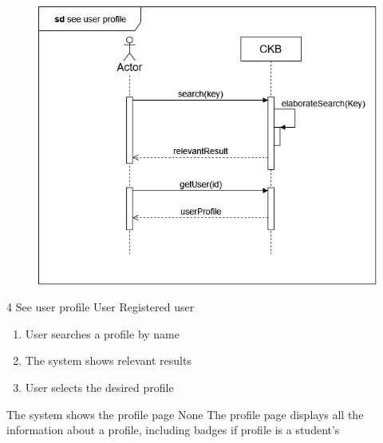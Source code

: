 \usecase
{
    \begin{figure}[H]
        \centering
        \includegraphics[width=\textwidth]{src/sequence_diagrams/userprofile.png}
    \end{figure}
}
{4}
{See user profile} %
{User} %
{Registered user} %
{ %
    \begin{enumerate}
        \item User searches a profile by name
        \item The system shows relevant results
        \item User selects the desired profile
    \end{enumerate}
}
{The system shows the profile page} %
{ %
    None
}
{ %
The profile page displays all the information about a profile, including badges if profile is a student's
}

